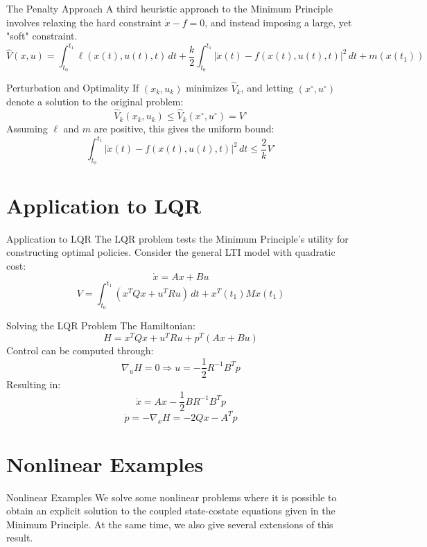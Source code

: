 \documentclass[10pt]{beamer}
\begin{document}
\begin{frame}[fragile]{The Penalty Approach}
  A third heuristic approach to the Minimum Principle involves relaxing the hard constraint \( \dot{x} - f = 0 \), and instead imposing a large, yet "soft" constraint.
  \[
  \hat{V}(x, u) = \int_{t_0}^{t_1} \ell(x(t), u(t), t) \, dt + \frac{k}{2} \int_{t_0}^{t_1} |\dot{x}(t) - f(x(t), u(t), t)|^2 \, dt + m(x(t_1))
  \]
  \end{frame}
  
  \begin{frame}[fragile]{Perturbation and Optimality}
  If \( (x_k, u_k) \) minimizes \( \hat{V}_k \), and letting \( (x^\circ, u^\circ) \) denote a solution to the original problem:
  \[
  \hat{V}_k(x_k, u_k) \leq \hat{V}_k(x^\circ, u^\circ) = V^\circ
  \]
  Assuming \( \ell \) and \( m \) are positive, this gives the uniform bound:
  \[
  \int_{t_0}^{t_1} |\dot{x}(t) - f(x(t), u(t), t)|^2 \, dt \leq \frac{2}{k} V^\circ
  \]
\end{frame}
  
\section{Application to LQR}
  
\begin{frame}[fragile]{Application to LQR}
  The LQR problem tests the Minimum Principle's utility for constructing optimal policies. Consider the general LTI model with quadratic cost:
  \[
  \dot{x} = Ax + Bu
  \]
  \[
  V = \int_{t_0}^{t_1} (x^T Q x + u^T R u) \, dt + x^T(t_1) M x(t_1)
  \]
\end{frame}
  
\begin{frame}[fragile]{Solving the LQR Problem}
  The Hamiltonian:
  \[
  H = x^T Q x + u^T R u + p^T (Ax + Bu)
  \]
  Control can be computed through:
  \[
  \nabla_u H = 0 \Rightarrow u = -\frac{1}{2} R^{-1} B^T p
  \]
  Resulting in:
  \[
  \dot{x} = Ax - \frac{1}{2} BR^{-1} B^T p
  \]
  \[
  \dot{p} = -\nabla_x H = -2Q x - A^T p
  \]
\end{frame}
  
\section{Nonlinear Examples}

\begin{frame}[fragile]{Nonlinear Examples}
  We solve some nonlinear problems where it is possible to obtain an explicit solution to the coupled state-costate equations given in the Minimum Principle. At the same time, we also give several extensions of this result.
\end{frame}
  
\end{document}
